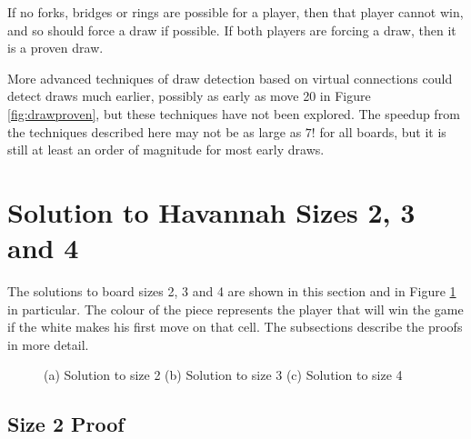 If no forks, bridges or rings are possible for a player, then that player cannot win, and so should force a draw if possible. If both players are forcing a draw, then it is a proven draw.

More advanced techniques of draw detection based on virtual connections could detect draws much earlier, possibly as early as move 20 in Figure \ref{fig:drawproven}, but these techniques have not been explored. The speedup from the techniques described here may not be as large as $7!$ for all boards, but it is still at least an order of magnitude for most early draws.


\section{Solution to Havannah Sizes 2, 3 and 4}

The solutions to board sizes 2, 3 and 4 are shown in this section and in Figure \ref{fig:solutionboard} in particular. The colour of the piece represents the player that will win the game if the white makes his first move on that cell. The subsections describe the proofs in more detail.

\begin{figure}[tb]
\centering
\caption{(a) Solution to size 2 (b) Solution to size 3 (c) Solution to size 4}
\label{fig:solutionboard}
\end{figure}


\subsection{Size 2 Proof}

